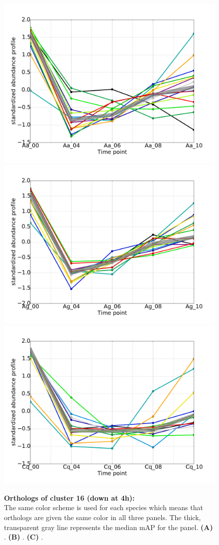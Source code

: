 \begin{figure}[hp]
% 
\subcaptionbox{\label{fig:cluster16-Aa}}
{\includegraphics[width=.5\linewidth]{figures/figs/ecr_and_insects_ptci_20130918_orthodb7/downAt4_gene_profiles_from_cummerbund/Aa_downAt4_cls16_Ag_target_FPKMs_vb_orthos.pdf}}
%
\subcaptionbox{\label{fig:cluster16-Ag}}
{\includegraphics[width=.5\linewidth]{figures/figs/ecr_and_insects_ptci_20130918_orthodb7/downAt4_gene_profiles_from_cummerbund/Ag_downAt4_cls16_Ag_target_FPKMs_vb_orthos.pdf}}
%
\subcaptionbox{\label{fig:cluster16-Cq}}
{\includegraphics[width=.5\linewidth]{figures/figs/ecr_and_insects_ptci_20130918_orthodb7/downAt4_gene_profiles_from_cummerbund/Cq_downAt4_cls16_Ag_target_FPKMs_vb_orthos.pdf}}
% 
\caption[Orthologs of cluster 16]{\sf \textbf{Orthologs of cluster 16 (down at 4h):}\\
The same color scheme is used for each species which means that orthologs are given the same color in all three panels.
The thick, transparent gray line represents the median \gls{mAP} for the panel.
\textbf{(A)} \Aa.
\textbf{(B)} \Ag.
\textbf{(C)} \Cq.
}\label{fig:cluster16}
\end{figure}